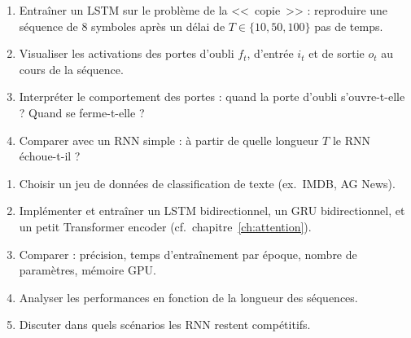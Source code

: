 \begin{exercice}
\begin{enumerate}
  \item Entra\^iner un LSTM sur le probl\`eme de la <<~copie~>> : reproduire
    une s\'equence de 8 symboles apr\`es un d\'elai de $T \in \{10, 50, 100\}$
    pas de temps.
  \item Visualiser les activations des portes d'oubli $f_t$, d'entr\'ee $i_t$
    et de sortie $o_t$ au cours de la s\'equence.
  \item Interpr\'eter le comportement des portes : quand la porte d'oubli
    s'ouvre-t-elle ? Quand se ferme-t-elle ?
  \item Comparer avec un RNN simple : \`a partir de quelle longueur $T$ le
    RNN \'echoue-t-il ?
\end{enumerate}
\end{exercice}

\begin{exercice}
\begin{enumerate}
  \item Choisir un jeu de donn\'ees de classification de texte (ex.\ IMDB,
    AG News).
  \item Impl\'ementer et entra\^iner un LSTM bidirectionnel, un GRU
    bidirectionnel, et un petit Transformer encoder
    (cf.\ chapitre~\ref{ch:attention}).
  \item Comparer : pr\'ecision, temps d'entra\^inement par \'epoque, nombre
    de param\`etres, m\'emoire GPU.
  \item Analyser les performances en fonction de la longueur des s\'equences.
  \item Discuter dans quels sc\'enarios les RNN restent comp\'etitifs.
\end{enumerate}
\end{exercice}
